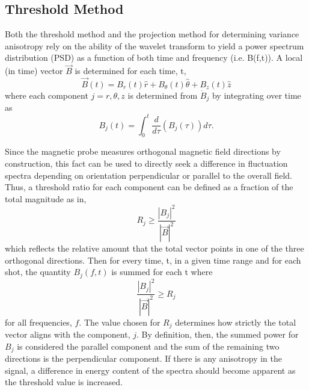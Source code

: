 \documentclass[aip,prl,amsmath,amssymb,reprint,superscriptaddress]{revtex4-1} %
\begin{document}
\subsection{Threshold Method}\label{sec:threshold}

Both the threshold method and the projection method for determining variance anisotropy rely on the ability of the wavelet transform to yield a power spectrum distribution (PSD) as a function of both time and frequency (i.e. B(f,t)). A local (in time) vector $\vec{B}$ is determined for each time, t,
\begin{equation}
\vec{B}(t) = B_{r}(t)\hat{r} + B_{\theta}(t)\hat{\theta} + B_{z}(t)\hat{z}
\label{eq:Bvector}
\end{equation}
where each component $j=r,\theta,z$ is determined from $\dot{B}_{j}$ by integrating over time as
\begin{equation}
B_{j}(t) = \int_{0}^{t} \frac{d}{d\tau}\left(B_{j}(\tau)\right) d\tau.
\label{eq:Bintegrated}
\end{equation}

Since the magnetic probe measures orthogonal magnetic field directions by construction, this fact can be used to directly seek a difference in fluctuation spectra depending on orientation perpendicular or parallel to the overall field. Thus, a threshold ratio for each component can be defined as a fraction of the total magnitude as in,
\begin{equation}
R_{j} \geq \frac{|B_{j}|^{2}}{|\vec{B}|^{2}}
\label{eq:Bthreshold}
\end{equation}
which reflects the relative amount that the total vector points in one of the three orthogonal directions. Then for every time, t, in a given time range and for each shot, the quantity $B_{j}(f,t)$ is summed for each t where
\begin{equation}
\frac{|B_{j}|^{2}}{|\vec{B}|^{2}} \geq R_{j}
\label{eq:Bcondition}
\end{equation}
for all frequencies, $f$. The value chosen for $R_{j}$ determines how strictly the total vector aligns with the component, $j$. By definition, then, the summed power for $B_{j}$ is considered the parallel component and the sum of the remaining two directions is the perpendicular component. If there is any anisotropy in the signal, a difference in energy content of the spectra should become apparent as the threshold value is increased.
\end{document}
